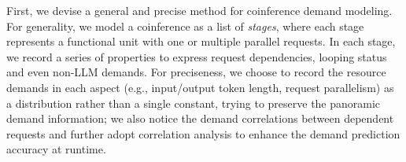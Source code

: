 
First, we devise a general and precise method for coinference demand modeling.
For generality, we model a coinference as a list of \emph{stages}, where each stage represents a functional unit with one or multiple parallel requests.
In each stage, we record a series of properties to express request dependencies, looping status and even non-LLM demands. %
For preciseness, we choose to record the resource demands in each aspect (e.g., input/output token length, request parallelism) as a distribution rather than a single constant, trying to preserve the panoramic demand information; we also notice the demand correlations between dependent requests and further adopt correlation analysis to enhance the demand prediction accuracy at runtime. 


